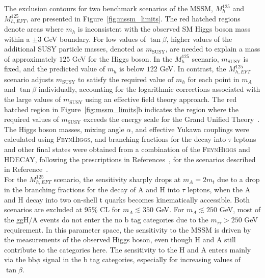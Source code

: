 The exclusion contours for two benchmark scenarios of the \ac{MSSM}, $M_{h}^{125}$ and $M_{h,EFT}^{125}$, are presented in Figure~\ref{fig:mssm_limits}. 
The red hatched regions denote areas where $m_{h}$ is inconsistent with the observed \ac{SM} Higgs boson mass within a ${\pm}3$ GeV boundary. 
For low values of $\tan\beta$, higher values of the additional SUSY particle masses, denoted as $m_{\text{SUSY}}$, are needed to explain a mass of approximately $125$ GeV for the Higgs boson. 
In the $M_{h}^{125}$ scenario, $m_{\text{SUSY}}$ is fixed, and the predicted value of $m_{h}$ is below $122$ GeV. 
In contrast, the $M_{h,EFT}^{125}$ scenario adjusts $m_{\text{SUSY}}$ to satisfy the required value of $m_{h}$ for each point in $m_{A}$ and $\tan\beta$ individually, accounting for the logarithmic corrections associated with the large values of $m_{\text{SUSY}}$ using an effective field theory approach. 
The red hatched region in Figure~\ref{fig:mssm_limits}b indicates the region where the required values of $m_{\text{SUSY}}$ exceeds the energy scale for the Grand Unified Theory~\cite{Bahl:2019ago}. 
The Higgs boson masses, mixing angle $\alpha$, and effective Yukawa couplings were calculated using \textsc{FeynHiggs}, and branching fractions for the decay into $\tau$ leptons and other final states were obtained from a combination of the \textsc{FeynHiggs} and \textsc{HDECAY}, following the prescriptions in References~\cite{LHCHiggsCrossSectionWorkingGroup:2013rie,deFlorian:2016spz,Denner:2011mq}, for the scenarios described in Reference~\cite{Bagnaschi:2791954}. \\

For the $M_{h,EFT}^{125}$ scenario, the sensitivity sharply drops at $m_{A}=2m_{t}$ due to a drop in the branching fractions for the decay of A and H into $\tau$ leptons, when the A and H decay into two on-shell t quarks becomes kinematically accessible. 
Both scenarios are excluded at 95\% CL for $m_{A}\lesssim350$ GeV. 
For $m_{A}\lesssim250$ GeV, most of the ggH/A events do not enter the no b tag categories due to the $m_{\tau\tau}>250$ GeV requirement. 
In this parameter space, the sensitivity to the \ac{MSSM} is driven by the measurements of the observed Higgs boson, even though H and A still contribute to the categories here. 
The sensitivity to the H and A enters mainly via the bb$\phi$ signal in the b tag categories, especially for increasing values of $\tan\beta$. \\


